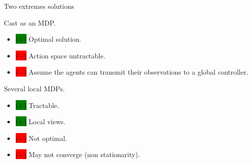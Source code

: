 \documentclass{beamer}
\newcommand{\cplus}{\colorbox{green}{($+$)} }
\newcommand{\cmoins}{\colorbox{red}{($-$)} }
\begin{document}
    \begin{frame}{Two extremes solutions}
        \pause
        \begin{block}{Cast as an MDP.}
            \begin{itemize}
                \item[] \cplus Optimal solution.
                \item[] \cmoins Action space untractable.
                \item[] \cmoins Assume the agents can transmit their observations to a global controller.
            \end{itemize}
        \end{block}
        \pause
        \begin{block}{Several local MDPs.}
            \begin{itemize}
                \item[] \cplus Tractable.
                \item[] \cplus Local views.
                \item[] \cmoins Not optimal.
                \item[] \cmoins May not converge (non stationarity).
            \end{itemize}
        \end{block}
    \end{frame}
\end{document}
